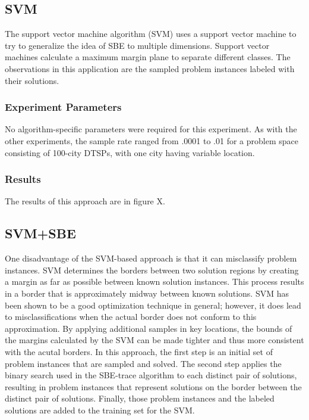 \subsection{SVM} 

The support vector machine algorithm (SVM) uses a support vector machine to try to generalize the idea of SBE to multiple dimensions.  Support vector machines calculate a maximum margin plane to separate different classes.  The observations in this application are the sampled problem instances labeled with their solutions.  

\subsubsection{Experiment Parameters}

No algorithm-specific parameters were required for this experiment.  As with the other experiments, the sample rate ranged from .0001 to .01 for a problem space consisting of 100-city DTSPs, with one city having variable location.

\subsubsection{Results}  The results of this approach are in figure X.

\subsection{SVM+SBE} 

One disadvantage of the SVM-based approach is that it can misclassify problem instances.  SVM determines the borders between two solution regions by creating a margin as far as possible between known solution instances.  This process results in a border that is approximately midway between known solutions.  SVM has been shown to be a good optimization technique in general; however, it does lead to misclassifications when the actual border does not conform to this approximation.  By applying additional samples in key locations, the bounds of the margins calculated by the SVM can be made tighter and thus more consistent with the acutal borders.  In this approach, the first step is an initial set of problem instances that are sampled and solved. The second step applies the binary search used in the SBE-trace algorithm to each distinct pair of solutions, resulting in problem instances that represent solutions on the border between the distinct pair of solutions.  Finally, those problem instances and the labeled solutions are added to the training set for the SVM. 

